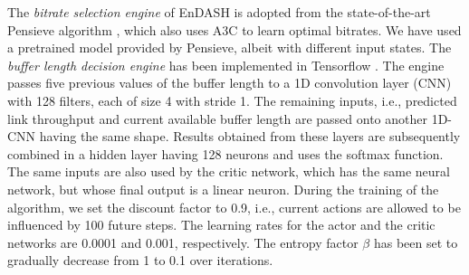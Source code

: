 The \textit{bitrate selection engine} of EnDASH is adopted from the state-of-the-art Pensieve algorithm \cite{mao2017neural}, which also uses A3C to learn optimal bitrates. We have used a pretrained model provided by Pensieve, albeit with different input states.  The \textit{buffer length decision engine} has been implemented in Tensorflow \cite{Abadi2016}. The engine passes five previous values of the buffer length to a 1D convolution layer (CNN) with 128 filters, each of size 4 with stride 1. The remaining inputs, i.e., predicted link throughput and current available buffer length are passed onto another 1D-CNN having the same shape. Results obtained from these layers are subsequently combined in a hidden layer having 128 neurons and uses the softmax function. The same inputs are also used by the critic network, which has the same neural network, but whose final output is a linear neuron. During the training of the algorithm, we set the discount factor to 0.9, i.e., current actions are allowed to be influenced by 100 future steps. The learning rates for the actor and the critic networks are 0.0001 and 0.001, respectively. The entropy factor $\beta$ has been set to gradually decrease from 1 to 0.1 over iterations.

